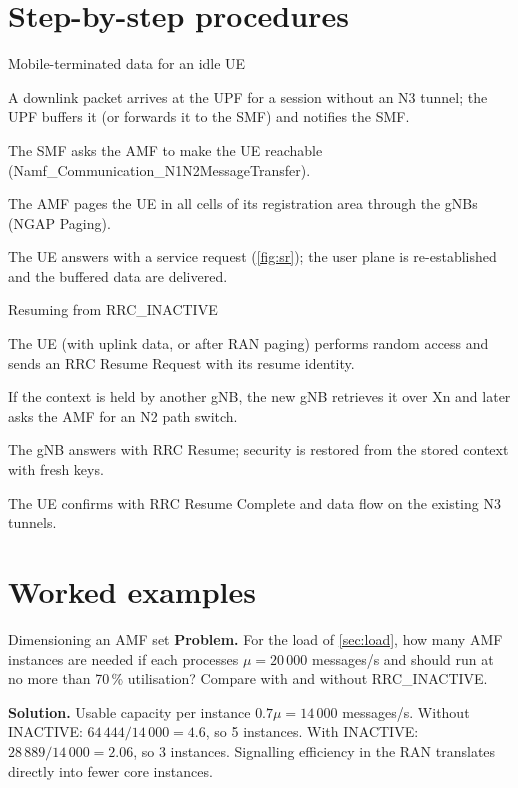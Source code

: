 \documentclass[11pt,a4paper]{article}
\begin{document}
\section{Step-by-step procedures}

\begin{procedurebox}{Mobile-terminated data for an idle UE}\label{proc:mt}
\begin{steps}
  \item A downlink packet arrives at the UPF for a session without an N3 tunnel; the UPF buffers it (or forwards it to the SMF) and notifies the SMF.
  \item The SMF asks the AMF to make the UE reachable (Namf\_Communication\_N1N2MessageTransfer).
  \item The AMF pages the UE in all cells of its registration area through the gNBs (NGAP Paging).
  \item The UE answers with a service request (\cref{fig:sr}); the user plane is re-established and the buffered data are delivered.
\end{steps}
\end{procedurebox}

\begin{procedurebox}{Resuming from RRC\_INACTIVE}\label{proc:resume}
\begin{steps}
  \item The UE (with uplink data, or after RAN paging) performs random access and sends an RRC Resume Request with its resume identity.
  \item If the context is held by another gNB, the new gNB retrieves it over Xn and later asks the AMF for an N2 path switch.
  \item The gNB answers with RRC Resume; security is restored from the stored context with fresh keys.
  \item The UE confirms with RRC Resume Complete and data flow on the existing N3 tunnels.
\end{steps}
\end{procedurebox}

\section{Worked examples}

\begin{examplebox}{Dimensioning an AMF set}\label{ex:load}
\textbf{Problem.} For the load of \cref{sec:load}, how many AMF instances are needed if each processes $\mu = 20\,000$ messages/s and should run at no
more than 70\,\% utilisation? Compare with and without RRC\_INACTIVE.

\textbf{Solution.} Usable capacity per instance $0.7\mu = 14\,000$ messages/s. Without INACTIVE: $64\,444/14\,000 = 4.6$, so 5 instances. With INACTIVE:
$28\,889/14\,000 = 2.06$, so 3 instances. Signalling efficiency in the RAN translates directly into fewer core instances.
\end{examplebox}
\end{document}
